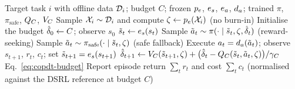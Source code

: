 \begin{algorithm}[t]
\caption{Deployment: budget-tracked safe control in a target task}
\label{alg:copdt-test}
\begin{algorithmic}[1]
\REQUIRE Target task $i$ with offline data $\mathcal{D}_i$; budget $C$; frozen $p_e$, $e_s$, $e_a$, $d_a$; trained $\pi$, $\pi_{\mathrm{safe}}$, $Q_C$, $V_C$
\STATE Sample $\mathcal{X}_i\sim\mathcal{D}_i$ and compute $\zeta\leftarrow p_e(\mathcal{X}_i)$ \hfill (no burn-in)
\STATE Initialise the budget $\hat{\delta}_0\leftarrow C$; observe $s_0$
  \STATE $\tilde s_t\leftarrow e_s(s_t)$
    \STATE Sample $\tilde a_t\sim\pi(\cdot\mid\tilde s_t,\zeta,\hat{\delta}_t)$ \hfill (reward-seeking)
  \ELSE
    \STATE Sample $\tilde a_t\sim\pi_{\mathrm{safe}}(\cdot\mid\tilde s_t,\zeta)$ \hfill (safe fallback)
  \ENDIF
  \STATE Execute $a_t=d_a(\tilde a_t)$; observe $s_{t+1}$, $r_t$, $c_t$; set $\tilde s_{t+1}=e_s(s_{t+1})$
  \STATE $\hat{\delta}_{t+1}\leftarrow V_C(\tilde s_{t+1},\zeta)+\big(\hat{\delta}_t-Q_C(\tilde s_t,\tilde a_t,\zeta)\big)/\gamma_C$ \hfill Eq.~\eqref{eq:copdt-budget}
\ENDFOR
\STATE Report episode return $\sum_t r_t$ and cost $\sum_t c_t$ (normalised against the DSRL reference at budget $C$)
\end{algorithmic}
\end{algorithm}
